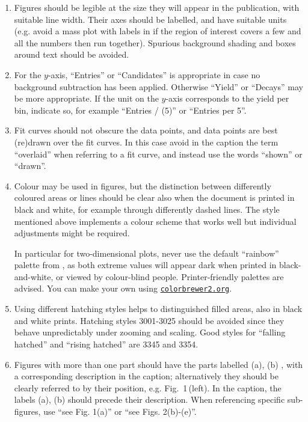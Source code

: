 \begin{enumerate}

\item Figures should be legible at the size they will appear in the
  publication, with suitable line width.  Their axes should be
  labelled, and have suitable units (e.g. avoid a mass plot with
  labels in \mevcc if the region of interest covers a few \gevcc
  and all the numbers then run together).  Spurious background shading
  and boxes around text should be avoided.

\item For the $y$-axis, ``Entries'' or ``Candidates'' is appropriate in case no
background subtraction has been applied. Otherwise ``Yield'' or ``Decays''
may be more appropriate. If the unit on the $y$-axis corresponds to 
the yield per bin, indicate so, for example ``Entries / (5\mevcc)'' or ``Entries per 5\mevcc''.


\item Fit curves should not obscure the data points, and
   data points are best (re)drawn over the fit curves. In this
   case avoid in the caption the term ``overlaid'' when
   referring to a fit curve, and instead use the words  
   ``shown'' or ``drawn''.

\item Colour may be used in figures, but the distinction between
  differently coloured areas or lines should be clear also when the
  document is printed in black and white, for example through
  differently dashed lines. The \lhcb style mentioned above implements
  a colour scheme that works well but individual adjustments might be
  required.

  In particular for two-dimensional plots, never use the default ``rainbow'' palette from \root, as both extreme values will appear dark when printed in black-and-white, or viewed by colour-blind people. Printer-friendly palettes are advised. You can make your own using \href{http://colorbrewer2.org}{\tt colorbrewer2.org}.

\item Using different hatching styles helps to distinguished filled areas, 
  also in black and white prints. Hatching styles 3001-3025 should be
  avoided since they behave unpredictably under zooming and scaling. 
  Good styles for ``falling hatched'' and ``rising hatched'' are 3345 and 3354.

\item Figures with more than one part should have the parts labelled
  (a), (b) \etc, with a corresponding description in the caption;
  alternatively they should be clearly referred to by their position,
  e.g. Fig.~1\,(left). In the caption, the labels (a), (b) \etc should
  precede their description. When referencing specific sub-figures,
  use ``see Fig. 1(a)'' or ``see Figs. 2(b)-(e)''.


\end{enumerate}
